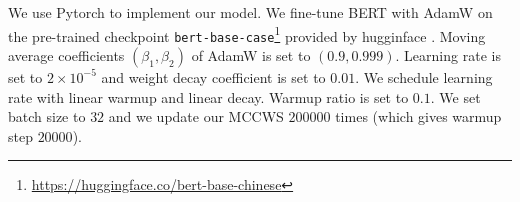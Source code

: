 \documentclass[11pt]{article}
\begin{document}


We use Pytorch \cite{paszke-etal-2019-pytorch} to implement our model.
We fine-tune BERT with AdamW \cite{loshchilov2018decoupled} on the pre-trained checkpoint \texttt{bert-base-case}\footnote{\url{https://huggingface.co/bert-base-chinese}} provided by hugginface \cite{wolf2019huggingface}.
Moving average coefficients \((\beta_1, \beta_2)\) of AdamW is set to \((0.9, 0.999)\).
Learning rate is set to \(2 \times 10^{-5}\) and weight decay coefficient is set to \(0.01\).
We schedule learning rate with linear warmup and linear decay.
Warmup ratio is set to \(0.1\).
We set batch size to \(32\) and we update our MCCWS \(200000\) times (which gives warmup step \(20000\)).
\end{document}
